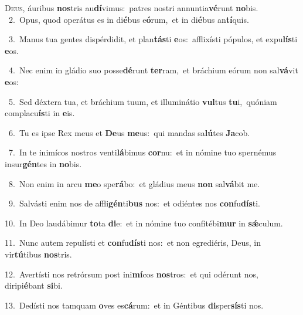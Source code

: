 \lettrine{\initial\textcolor{\initialcolor}{D}}{eus,} áuribus \textbf{nos}\-tris au\-\textbf{dí}\-vimus:~\star patres nostri annuntia\-\textbf{vé}\-runt \textbf{no}\-bis.\\
{\numbfont\textcolor{\numbcolor}{~2.}}~Opus, quod operátus es in di\-\textbf{é}\-bus e\-\textbf{ó}\-rum,~\star et in di\-\textbf{é}\-bus an\-\textbf{tí}\-quis.\par
{\numbfont\textcolor{\numbcolor}{~3.}}~Manus tua gentes dispérdidit, et plan\-\textbf{tás}\-ti \textbf{e}\-os:~\star afflixísti pópulos, et expu\-\textbf{lís}\-ti \textbf{e}\-os.\par
{\numbfont\textcolor{\numbcolor}{~4.}}~Nec enim in gládio suo posse\-\textbf{dé}\-runt \textbf{ter}\-ram,~\star et bráchium eórum non sal\-\textbf{vá}\-vit \textbf{e}\-os:\par
{\numbfont\textcolor{\numbcolor}{~5.}}~Sed déxtera tua, et bráchium tuum, et illuminátio \textbf{vul}\-tus \textbf{tu}\-i,~\star quóniam complacu\-\textbf{ís}\-ti in \textbf{e}\-is.\par
{\numbfont\textcolor{\numbcolor}{~6.}}~Tu es ipse Rex meus et \textbf{De}\-us \textbf{me}\-us:~\star qui mandas sa\-\textbf{lú}\-tes \textbf{Ja}\-cob.\par
{\numbfont\textcolor{\numbcolor}{~7.}}~In te inimícos nostros venti\-\textbf{lá}\-bimus \textbf{cor}\-nu:~\star et in nómine tuo spernémus insur\-\textbf{gén}\-tes in \textbf{no}\-bis.\par
{\numbfont\textcolor{\numbcolor}{~8.}}~Non enim in arcu \textbf{me}\-o spe\-\textbf{rá}\-bo:~\star et gládius meus \textbf{non} sal\-\textbf{vá}\-bit me.\par
{\numbfont\textcolor{\numbcolor}{~9.}}~Salvásti enim nos de affli\-\textbf{gén}\-ti\textbf{bus} nos:~\star et odiéntes nos \textbf{con}\-fu\-\textbf{dís}\-ti.\par
{\numbfont\textcolor{\numbcolor}{10.}}~In Deo laudábimur \textbf{to}\-ta \textbf{di}\-e:~\star et in nómine tuo confitébi\textbf{mur} in \textbf{sǽ}\-culum.\par
{\numbfont\textcolor{\numbcolor}{11.}}~Nunc autem repulísti et \textbf{con}\-fu\-\textbf{dís}\-ti nos:~\star et non egrediéris, Deus, in vir\-\textbf{tú}\-tibus \textbf{nos}\-tris.\par
{\numbfont\textcolor{\numbcolor}{12.}}~Avertísti nos retrórsum post ini\-\textbf{mí}\-cos \textbf{nos}\-tros:~\star et qui odérunt nos, diripi\-\textbf{é}\-bant \textbf{si}\-bi.\par
{\numbfont\textcolor{\numbcolor}{13.}}~Dedísti nos tamquam \textbf{o}\-ves es\-\textbf{cá}\-rum:~\star et in Géntibus \textbf{di}\-sper\-\textbf{sís}\-ti nos.\par

